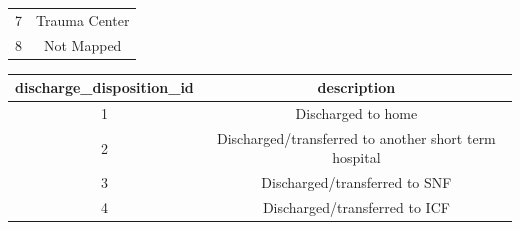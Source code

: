 \documentclass[]{article}
\begin{document}
\begin{itemize}
\begin{longtable}[c]{@{}cc@{}}
\begin{minipage}[t]{0.26\columnwidth}
  7
  \strut\end{minipage} &
  \begin{minipage}[t]{0.17\columnwidth}\centering\strut
  Trauma Center
  \strut\end{minipage}\tabularnewline
  \begin{minipage}[t]{0.26\columnwidth}\centering\strut
  8
  \strut\end{minipage} &
  \begin{minipage}[t]{0.17\columnwidth}\centering\strut
  Not Mapped
  \strut\end{minipage}\tabularnewline
  \bottomrule
  \end{longtable}

  \begin{longtable}[c]{@{}cc@{}}
  \toprule
  \begin{minipage}[b]{0.35\columnwidth}\centering\strut
  discharge\_disposition\_id
  \strut\end{minipage} &
  \begin{minipage}[b]{0.41\columnwidth}\centering\strut
  description
  \strut\end{minipage}\tabularnewline
  \midrule
  \endhead
  \begin{minipage}[t]{0.35\columnwidth}\centering\strut
  1
  \strut\end{minipage} &
  \begin{minipage}[t]{0.41\columnwidth}\centering\strut
  Discharged to home
  \strut\end{minipage}\tabularnewline
  \begin{minipage}[t]{0.35\columnwidth}\centering\strut
  2
  \strut\end{minipage} &
  \begin{minipage}[t]{0.41\columnwidth}\centering\strut
  Discharged/transferred to another short term hospital
  \strut\end{minipage}\tabularnewline
  \begin{minipage}[t]{0.35\columnwidth}\centering\strut
  3
  \strut\end{minipage} &
  \begin{minipage}[t]{0.41\columnwidth}\centering\strut
  Discharged/transferred to SNF
  \strut\end{minipage}\tabularnewline
  \begin{minipage}[t]{0.35\columnwidth}\centering\strut
  4
  \strut\end{minipage} &
  \begin{minipage}[t]{0.41\columnwidth}\centering\strut
  Discharged/transferred to ICF

\end{minipage}
\end{longtable}
\end{itemize}
\end{document}
